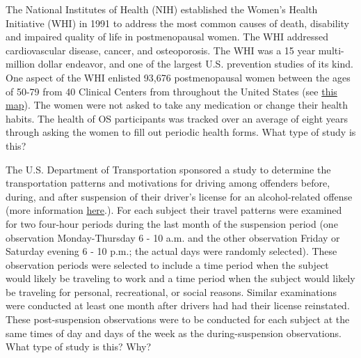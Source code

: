 \documentclass[10pt,openany]{book}\usepackage[]{graphicx}\usepackage[]{color}
\begin{document}
\newpage
\begin{exsection}
  \item \label{revex:ObsSWIH} The National Institutes of Health (NIH) established the Women's Health Initiative (WHI) in 1991 to address the most common causes of death, disability and impaired quality of life in postmenopausal women.  The WHI addressed cardiovascular disease, cancer, and osteoporosis.  The WHI was a 15 year multi-million dollar endeavor, and one of the largest U.S. prevention studies of its kind.  One aspect of the WHI enlisted 93,676 postmenopausal women between the ages of 50-79 from 40 Clinical Centers from throughout the United States (see \href{http://www.nhlbi.nih.gov/whi/whict.htm#map}{this map}).  The women were not asked to take any medication or change their health habits.  The health of OS participants was tracked over an average of eight years through asking the women to fill out periodic health forms.  What type of study is this? 

  \item \label{revex:ObsSDOT} The U.S. Department of Transportation sponsored a study to determine the transportation patterns and motivations for driving among offenders before, during, and after suspension of their driver's license for an alcohol-related offense (more information \href{http://www.nhtsa.dot.gov/people/injury/research/observation_study/index.htm}{here}.).  For each subject their travel patterns were examined for two four-hour periods during the last month of the suspension period (one observation Monday-Thursday 6 - 10 a.m. and the other observation Friday or Saturday evening 6 - 10 p.m.; the actual days were randomly selected).  These observation periods were selected to include a time period when the subject would likely be traveling to work and a time period when the subject would likely be traveling for personal, recreational, or social reasons.  Similar examinations were conducted at least one month after drivers had had their license reinstated. These post-suspension observations were to be conducted for each subject at the same times of day and days of the week as the during-suspension observations.  What type of study is this?  Why? 


\end{exsection}
\end{document}
